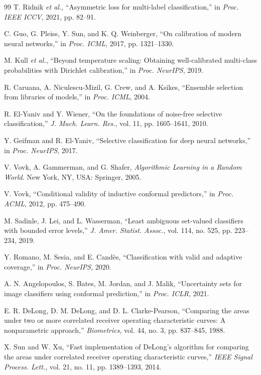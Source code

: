 \documentclass[journal]{IEEEtran}
\begin{document}
\begin{thebibliography}{99}
 T. Ridnik \emph{et al.}, ``Asymmetric loss for multi-label
classification,'' in \emph{Proc. IEEE ICCV}, 2021, pp. 82--91.

 C. Guo, G. Pleiss, Y. Sun, and K. Q. Weinberger, ``On
calibration of modern neural networks,'' in \emph{Proc. ICML}, 2017, pp. 1321--1330.

 M. Kull \emph{et al.}, ``Beyond temperature scaling: Obtaining
well-calibrated multi-class probabilities with Dirichlet calibration,'' in \emph{Proc.
NeurIPS}, 2019.

 R. Caruana, A. Niculescu-Mizil, G. Crew, and A. Ksikes,
``Ensemble selection from libraries of models,'' in \emph{Proc. ICML}, 2004.

 R. El-Yaniv and Y. Wiener, ``On the foundations of
noise-free selective classification,'' \emph{J. Mach. Learn. Res.}, vol. 11, pp. 1605--1641,
2010.

 Y. Geifman and R. El-Yaniv, ``Selective classification for
deep neural networks,'' in \emph{Proc. NeurIPS}, 2017.

 V. Vovk, A. Gammerman, and G. Shafer, \emph{Algorithmic
Learning in a Random World}. New York, NY, USA: Springer, 2005.

 V. Vovk, ``Conditional validity of inductive conformal
predictors,'' in \emph{Proc. ACML}, 2012, pp. 475--490.

 M. Sadinle, J. Lei, and L. Wasserman, ``Least ambiguous set-valued
classifiers with bounded error levels,'' \emph{J. Amer. Statist. Assoc.}, vol. 114, no. 525,
pp. 223--234, 2019.

 Y. Romano, M. Sesia, and E. Cand\`{e}s, ``Classification with valid
and adaptive coverage,'' in \emph{Proc. NeurIPS}, 2020.

 A. N. Angelopoulos, S. Bates, M. Jordan, and J. Malik,
``Uncertainty sets for image classifiers using conformal prediction,'' in \emph{Proc. ICLR},
2021.

 E. R. DeLong, D. M. DeLong, and D. L. Clarke-Pearson, ``Comparing the
areas under two or more correlated receiver operating characteristic curves: A nonparametric
approach,'' \emph{Biometrics}, vol. 44, no. 3, pp. 837--845, 1988.

 X. Sun and W. Xu, ``Fast implementation of DeLong's algorithm for
comparing the areas under correlated receiver operating characteristic curves,'' \emph{IEEE
Signal Process. Lett.}, vol. 21, no. 11, pp. 1389--1393, 2014.


\end{thebibliography}
\end{document}
